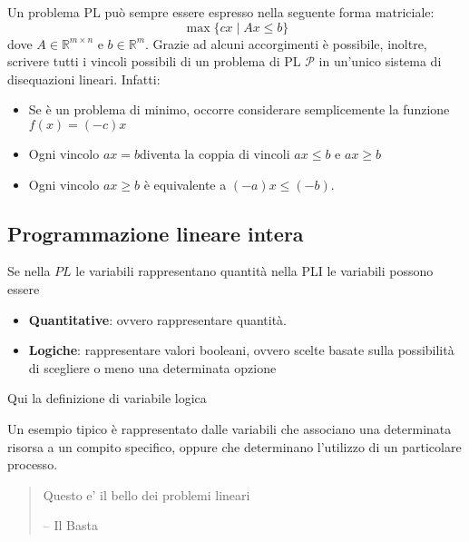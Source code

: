   


Un problema PL può sempre essere espresso nella seguente forma matriciale:
\[
  \max \{cx \mid Ax \leq b\}
\]
dove $ A \in \mathbb{R}^{m \times n} $ e $ b \in \mathbb{R}^m $. Grazie ad alcuni accorgimenti è possibile, inoltre, scrivere tutti i vincoli possibili di un problema di PL $\mathcal{P}$ in un'unico sistema di disequazioni lineari. Infatti:
\begin{itemize}
  \item Se \p è un problema di minimo, occorre considerare semplicemente la funzione $f (x) = (-c)x$
  \item Ogni vincolo $ax = b $diventa la coppia di vincoli $ax \leq b$ e $ax \geq b$
  \item Ogni vincolo $ax \geq b$ è equivalente a $(-a)x \leq (-b)$.
\end{itemize}

\subsection{Programmazione lineare intera}
Se nella $PL$ le variabili rappresentano quantità nella PLI le variabili possono essere
\begin{itemize}
  \item \textbf{Quantitative}: ovvero rappresentare quantità.
  \item \textbf{Logiche}: rappresentare valori booleani, ovvero scelte basate sulla possibilità di scegliere o meno una determinata opzione
\end{itemize}

Qui la definizione di variabile logica


Un esempio tipico è rappresentato dalle variabili che associano una determinata risorsa a un compito specifico, oppure che determinano l'utilizzo di un particolare processo.

\begin{quote}
  Questo e' il bello dei problemi lineari

  \hfill -- Il Basta
\end{quote}

